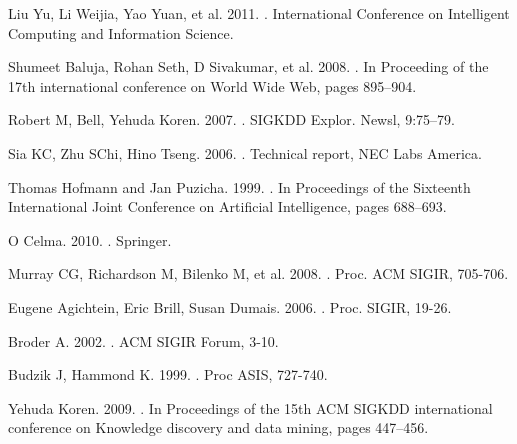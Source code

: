 \begin{thebibliography}{10}
Liu Yu, Li Weijia, Yao Yuan, et al. 2011.
.
\newblock International Conference on Intelligent Computing and Information Science.

Shumeet Baluja, Rohan Seth, D Sivakumar, et al. 2008.
.
\newblock In Proceeding of the 17th international conference on World Wide Web, pages 895–904.

Robert M, Bell, Yehuda Koren. 2007.
.
\newblock SIGKDD Explor. Newsl, 9:75–79.

Sia KC, Zhu SChi, Hino Tseng. 2006.
.
\newblock Technical report, NEC Labs America. 

Thomas Hofmann and Jan Puzicha. 1999. 
.
\newblock In Proceedings of the Sixteenth International Joint Conference on Artificial Intelligence, pages 688–693.

O Celma. 2010.
.
\newblock Springer.

Murray CG, Richardson M, Bilenko M, et al. 2008.
.
\newblock Proc. ACM SIGIR, 705-706.

Eugene Agichtein, Eric Brill, Susan Dumais. 2006. 
.
\newblock Proc. SIGIR, 19-26.

Broder A. 2002.
.
\newblock ACM SIGIR Forum, 3-10.

Budzik J, Hammond K. 1999.
.
\newblock Proc ASIS, 727-740.

Yehuda Koren. 2009.
.
\newblock In Proceedings of the 15th ACM SIGKDD international conference on Knowledge discovery and data mining, pages 447–456.


\end{thebibliography}
